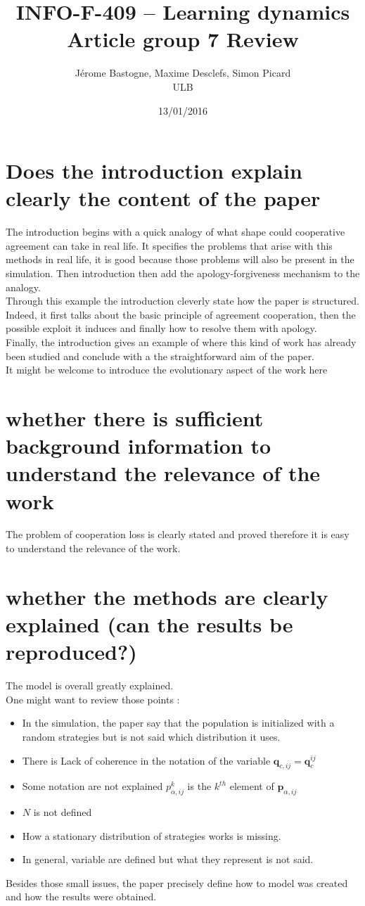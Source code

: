 \documentclass{article}
\title{INFO-F-409 -- Learning dynamics\\Article group 7 Review}
\date{13/01/2016}
\author{Jérome Bastogne, Maxime Desclefs, Simon Picard\\\textsc{ULB}}
\begin{document}
\maketitle

\section{Does the introduction explain clearly the content of the paper}
The introduction begins with a quick analogy of what shape could cooperative agreement can take in real life. It specifies the problems that arise with this methods in real life, it is good because those problems will also be present in the simulation. Then introduction then add the apology-forgiveness mechanism to the analogy.\\
Through this example the introduction cleverly state how the paper is structured. Indeed, it first talks about the basic principle of agreement cooperation, then the possible exploit it induces and finally how to resolve them with apology.\\
Finally, the introduction gives an example of where this kind of work has already been studied and conclude with a the straightforward aim of the paper.\\

It might be welcome to introduce the evolutionary aspect of the work here


\section{whether there is sufficient background information to understand the relevance of the work}
The problem of cooperation loss is clearly stated and proved therefore it is easy to understand the relevance of the work.


\section{whether the methods are clearly explained (can the results be reproduced?)}
The model is overall greatly explained.\\
One might want to review those points :
\begin{itemize}
\item In the simulation, the paper say that the population is initialized with a random strategies but is not said which distribution it uses.
\item There is Lack of coherence in the notation of the variable $\mathbf{q}_{c, ij} = \mathbf{q}_{c}^{ij}$
\item Some notation are not explained $p^{k}_{\alpha, ij}$ is the $k^{th}$ element of $\mathbf{p}_{\alpha,ij}$
\item $N$ is not defined
\item How a stationary distribution of strategies works is missing.
\item In general, variable are defined but what they represent is not said.
\end{itemize}
Besides those small issues, the paper precisely define how to model was created and how the results were obtained.
\end{document}
